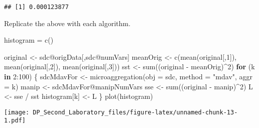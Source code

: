 \documentclass[
]{article}
\newenvironment{Shaded}{\begin{snugshade}}{\end{snugshade}}
\newcommand{\AttributeTok}[1]{\textcolor[rgb]{0.77,0.63,0.00}{#1}}
\newcommand{\ControlFlowTok}[1]{\textcolor[rgb]{0.13,0.29,0.53}{\textbf{#1}}}
\newcommand{\DecValTok}[1]{\textcolor[rgb]{0.00,0.00,0.81}{#1}}
\newcommand{\FunctionTok}[1]{\textcolor[rgb]{0.00,0.00,0.00}{#1}}
\newcommand{\NormalTok}[1]{#1}
\newcommand{\OtherTok}[1]{\textcolor[rgb]{0.56,0.35,0.01}{#1}}
\newcommand{\SpecialCharTok}[1]{\textcolor[rgb]{0.00,0.00,0.00}{#1}}
\newcommand{\StringTok}[1]{\textcolor[rgb]{0.31,0.60,0.02}{#1}}
\begin{document}
\begin{Shaded}
\end{Shaded}

\begin{verbatim}
## [1] 0.000123877
\end{verbatim}

Replicate the above with each algorithm.

\begin{Shaded}
\begin{Highlighting}[]
\NormalTok{histogram }\OtherTok{=} \FunctionTok{c}\NormalTok{()}
\end{Highlighting}
\end{Shaded}

\begin{Shaded}
\begin{Highlighting}[]
\NormalTok{original }\OtherTok{\textless{}{-}}\NormalTok{ sdc}\SpecialCharTok{@}\NormalTok{origData[,sdc}\SpecialCharTok{@}\NormalTok{numVars]}
\NormalTok{meanOrig }\OtherTok{\textless{}{-}} \FunctionTok{c}\NormalTok{(}\FunctionTok{mean}\NormalTok{(original[,}\DecValTok{1}\NormalTok{]), }\FunctionTok{mean}\NormalTok{(original[,}\DecValTok{2}\NormalTok{]), }\FunctionTok{mean}\NormalTok{(original[,}\DecValTok{3}\NormalTok{]))}
\NormalTok{sst }\OtherTok{\textless{}{-}} \FunctionTok{sum}\NormalTok{((original }\SpecialCharTok{{-}}\NormalTok{ meanOrig)}\SpecialCharTok{\^{}}\DecValTok{2}\NormalTok{)}
\ControlFlowTok{for}\NormalTok{ (k }\ControlFlowTok{in} \DecValTok{2}\SpecialCharTok{:}\DecValTok{100}\NormalTok{) \{}
\NormalTok{  sdcMdavFor }\OtherTok{\textless{}{-}} \FunctionTok{microaggregation}\NormalTok{(}\AttributeTok{obj =}\NormalTok{ sdc, }\AttributeTok{method =} \StringTok{"mdav"}\NormalTok{, }\AttributeTok{aggr =}\NormalTok{ k)}
\NormalTok{  manip }\OtherTok{\textless{}{-}}\NormalTok{ sdcMdavFor}\SpecialCharTok{@}\NormalTok{manipNumVars}
\NormalTok{  sse }\OtherTok{\textless{}{-}} \FunctionTok{sum}\NormalTok{((original }\SpecialCharTok{{-}}\NormalTok{ manip)}\SpecialCharTok{\^{}}\DecValTok{2}\NormalTok{)}
\NormalTok{  L }\OtherTok{\textless{}{-}}\NormalTok{ sse }\SpecialCharTok{/}\NormalTok{ sst}
\NormalTok{  histogram[k] }\OtherTok{\textless{}{-}}\NormalTok{ L}
\NormalTok{\}}
\FunctionTok{plot}\NormalTok{(histogram)}
\end{Highlighting}
\end{Shaded}

\texttt{[image: DP\_Second\_Laboratory\_files/figure-latex/unnamed-chunk-13-1.pdf]}
\end{document}

